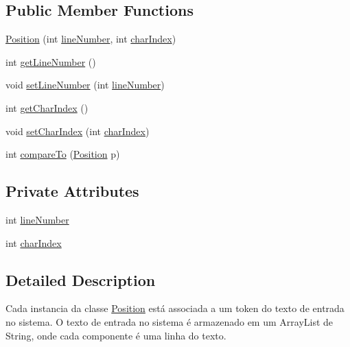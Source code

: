 \subsection*{Public Member Functions}
\begin{DoxyCompactItemize}
\item 
\hyperlink{classbr_1_1usp_1_1cata_1_1model_1_1_position_a83d603385dabfa79c139cc68bbd11f0a}{Position} (int \hyperlink{classbr_1_1usp_1_1cata_1_1model_1_1_position_a5f6262aa5dbef1aa98d10200c7bcba7f}{line\+Number}, int \hyperlink{classbr_1_1usp_1_1cata_1_1model_1_1_position_a0d203eed7fb6a2055be2794eca2072e3}{char\+Index})
\item 
int \hyperlink{classbr_1_1usp_1_1cata_1_1model_1_1_position_a88dd1e31df9ea449b12983a9dbeab323}{get\+Line\+Number} ()
\item 
void \hyperlink{classbr_1_1usp_1_1cata_1_1model_1_1_position_a00f2c26d025198ddb285a95f58ab44e7}{set\+Line\+Number} (int \hyperlink{classbr_1_1usp_1_1cata_1_1model_1_1_position_a5f6262aa5dbef1aa98d10200c7bcba7f}{line\+Number})
\item 
int \hyperlink{classbr_1_1usp_1_1cata_1_1model_1_1_position_a6cb8222f75bd178d700e431383ed4aec}{get\+Char\+Index} ()
\item 
void \hyperlink{classbr_1_1usp_1_1cata_1_1model_1_1_position_a6604c3eda1ebde02754da292a68ced4f}{set\+Char\+Index} (int \hyperlink{classbr_1_1usp_1_1cata_1_1model_1_1_position_a0d203eed7fb6a2055be2794eca2072e3}{char\+Index})
\item 
int \hyperlink{classbr_1_1usp_1_1cata_1_1model_1_1_position_a2df4278b22d8c255f47f219ab4c82986}{compare\+To} (\hyperlink{classbr_1_1usp_1_1cata_1_1model_1_1_position}{Position} p)
\end{DoxyCompactItemize}
\subsection*{Private Attributes}
\begin{DoxyCompactItemize}
\item 
int \hyperlink{classbr_1_1usp_1_1cata_1_1model_1_1_position_a5f6262aa5dbef1aa98d10200c7bcba7f}{line\+Number}
\item 
int \hyperlink{classbr_1_1usp_1_1cata_1_1model_1_1_position_a0d203eed7fb6a2055be2794eca2072e3}{char\+Index}
\end{DoxyCompactItemize}


\subsection{Detailed Description}
Cada instancia da classe \hyperlink{classbr_1_1usp_1_1cata_1_1model_1_1_position}{Position} está associada a um token do texto de entrada no sistema. O texto de entrada no sistema é armazenado em um Array\+List de String, onde cada componente é uma linha do texto. 

